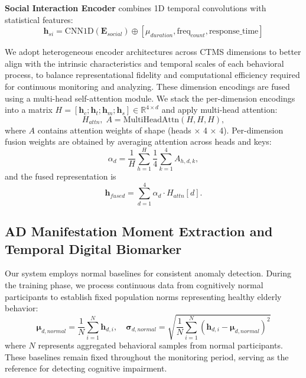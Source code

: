 \documentclass[sigconf, anonymous, 9pt, nonacm]{acmart}
\begin{document}
\noindent\textbf{Social Interaction Encoder} combines 1D temporal convolutions with statistical features:
\begin{equation*}
\mathbf{h}_{si} = \text{CNN1D}(\mathbf{E}_{social}) \oplus [\mu_{duration}, \text{freq}_{count}, \text{response\_time}]
\end{equation*}

We adopt heterogeneous encoder architectures across CTMS dimensions to better align with the intrinsic characteristics and temporal scales of each behavioral process, to balance representational fidelity and computational efficiency required for continuous monitoring and analyzing.
These dimension encodings are fused using a multi-head self-attention module. We stack the per-dimension encodings into a matrix
\(H=[\mathbf{h}_c;\mathbf{h}_t;\mathbf{h}_m;\mathbf{h}_s]\in\mathbb{R}^{4\times d}\) and apply multi-head attention:
\begin{equation*}
H_{attn},\;A = \text{MultiHeadAttn}(H,H,H),
\end{equation*}
where $A$ contains attention weights of shape (heads × 4 × 4). Per-dimension fusion weights are obtained by averaging attention across heads and keys:
\begin{equation*}
\alpha_d = \frac{1}{H}\sum_{h=1}^{H}\frac{1}{4}\sum_{k=1}^{4} A_{h,d,k},
\end{equation*}
and the fused representation is
\begin{equation*}
\mathbf{h}_{fused} = \sum_{d=1}^{4} \alpha_d \cdot H_{attn}[d].
\end{equation*}


\subsection{AD Manifestation Moment Extraction and Temporal Digital Biomarker}

Our system employs normal baselines for consistent anomaly detection. During the training phase, we process continuous data from cognitively normal participants to establish fixed population norms representing healthy elderly behavior:
\begin{equation*}
\boldsymbol{\mu}_{d,normal} = \frac{1}{N}\sum_{i=1}^{N}\mathbf{h}_{d,i}, \quad \boldsymbol{\sigma}_{d,normal} = \sqrt{\frac{1}{N}\sum_{i=1}^{N}(\mathbf{h}_{d,i} - \boldsymbol{\mu}_{d,normal})^2}
\end{equation*}
where $N$ represents aggregated behavioral samples from normal participants. These baselines remain fixed throughout the monitoring period, serving as the reference for detecting cognitive impairment.
\end{document}
